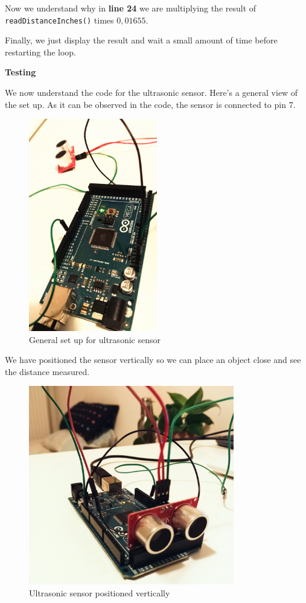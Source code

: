 Now we understand why in \textbf{line 24} we are multiplying the result of \verb|readDistanceInches()| times \(0,01655\).

Finally, we just display the result and wait a small amount of time before restarting the loop.

\vspace{7mm}
\textbf{Testing}

We now understand the code for the ultrasonic sensor. Here's a general view of the set up. As it can be observed in the code, the sensor is connected to pin 7.

\begin{figure}[H]
    \centering
    \includegraphics[width=0.5\textwidth]{fig/ultrasonic-setup1.jpeg}
    \caption{General set up for ultrasonic sensor}
    \label{fig:ultrasonic-setup1}
\end{figure}

We have positioned the sensor vertically so we can place an object close and see the distance measured.

\begin{figure}[H]
    \centering
    \includegraphics[width=0.8\textwidth]{fig/ultrasonic-setup2.jpeg}
    \caption{Ultrasonic sensor positioned vertically}
    \label{fig:ultrasonic-setup2}
\end{figure}

